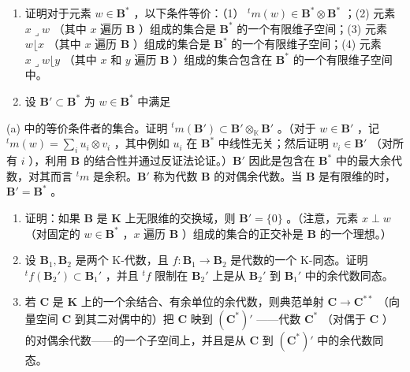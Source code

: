 \begin{enumerate}
\def\labelenumi{(\alph{enumi})}
\item
  证明对于元素 \(w \in \mathbf{B}^*\) ，以下条件等价：（1） \({}^t m(w) \in \mathbf{B}^* \otimes \mathbf{B}^*\) ；(2) 元素 \(x \lrcorner w\) （其中 \(x\) 遍历 \(\mathbf{B}\) ）组成的集合是 \(\mathbf{B}^*\) 的一个有限维子空间；(3) 元素 \(w \lfloor x\) （其中 \(x\) 遍历 \(\mathbf{B}\) ）组成的集合是 \(\mathbf{B}^*\) 的一个有限维子空间；(4) 元素 \(x \lrcorner w \lfloor y\) （其中 \(x\) 和 \(y\) 遍历 \(\mathbf{B}\) ）组成的集合包含在 \(\mathbf{B}^*\) 的一个有限维子空间中。
\item
  设 \(\mathbf{B}' \subset \mathbf{B}^*\) 为 \(w \in \mathbf{B}^*\) 中满足
\end{enumerate}

(a) 中的等价条件者的集合。证明 \({}^t m(\mathbf{B}') \subset \mathbf{B}' \otimes_{\mathbb{K}} \mathbf{B}'\) 。（对于 \(w \in \mathbf{B}'\) ，记 \({}^t m(w) = \sum_i u_i \otimes v_i\) ，其中例如 \(u_i\) 在 \(\mathbf{B}^*\) 中线性无关；然后证明 \(v_i \in \mathbf{B}'\) （对所有 \(i\) ），利用 \(\mathbf{B}\) 的结合性并通过反证法论证。）\(\mathbf{B}'\) 因此是包含在 \(\mathbf{B}^*\) 中的最大余代数，对其而言 \({}^t m\) 是余积。\(\mathbf{B}'\) 称为代数 \(\mathbf{B}\) 的对偶余代数。当 \(\mathbf{B}\) 是有限维的时， \(\mathbf{B}' = \mathbf{B}^*\) 。

\begin{enumerate}
\def\labelenumi{(\alph{enumi})}
\setcounter{enumi}{2}
\item
  证明：如果 \(\mathbf{B}\) 是 \(\mathbf{K}\) 上无限维的交换域，则 \(\mathbf{B}' = \{0\}\) 。（注意，元素 \(x \perp w\) （对固定的 \(w \in \mathbf{B}^*\) ，\(x\) 遍历 \(\mathbf{B}\) ）组成的集合的正交补是 \(\mathbf{B}\) 的一个理想。）
\item
  设 \(\mathbf{B}_1, \mathbf{B}_2\) 是两个 K-代数，且 \(f: \mathbf{B}_1 \to \mathbf{B}_2\) 是代数的一个 K-同态。证明 \(^t f(\mathbf{B}_2') \subset \mathbf{B}_1'\) ，并且 \(^t f\) 限制在 \(\mathbf{B}_2'\) 上是从 \(\mathbf{B}_2'\) 到 \(\mathbf{B}_1'\) 中的余代数同态。
\item
  若 \(\mathbf{C}\) 是 \(\mathbf{K}\) 上的一个余结合、有余单位的余代数，则典范单射 \(\mathbf{C} \to \mathbf{C}^{**}\) （向量空间 \(\mathbf{C}\) 到其二对偶中的）把 \(\mathbf{C}\) 映到 \((\mathbf{C}^*)'\) ——代数 \(\mathbf{C}^*\) （对偶于 \(\mathbf{C}\) ）的对偶余代数——的一个子空间上，并且是从 \(\mathbf{C}\) 到 \((\mathbf{C}^*)'\) 中的余代数同态。
\end{enumerate}

